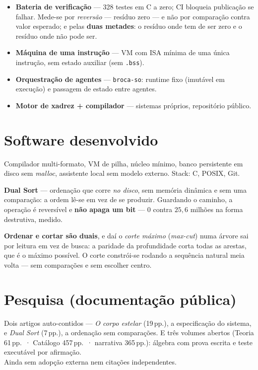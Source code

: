 \documentclass[10pt,a4paper]{article}
\begin{document}
\begin{itemize}
\item \textbf{Bateria de verificação} --- 328 testes em C a zero; CI bloqueia publicação se falhar.
Mede-se por \emph{reversão} --- resíduo zero --- e não por comparação contra valor esperado; e pelas
\textbf{duas metades}: o resíduo onde tem de ser zero e o resíduo onde não pode ser.
\item \textbf{Máquina de uma instrução} --- VM com ISA mínima de uma única instrução,
sem estado auxiliar (sem \texttt{.bss}).
\item \textbf{Orquestração de agentes} --- \texttt{broca-so}: runtime fixo (imutável em
execução) e passagem de estado entre agentes.
\item \textbf{Motor de xadrez + compilador} --- sistemas próprios, repositório público.
\end{itemize}

\section*{Software desenvolvido}

Compilador multi-formato, VM de pilha, núcleo mínimo, banco persistente em disco sem
\emph{malloc}, assistente local sem modelo externo. Stack: C, POSIX, Git.

\smallskip
\noindent \textbf{Dual Sort} --- ordenação que corre \emph{no disco}, sem memória dinâmica e sem
uma comparação: a ordem lê-se em vez de se produzir. Guardando o caminho, a operação é reversível e
\textbf{não apaga um bit} --- $0$ contra $25{,}6$ milhões na forma destrutiva, medido.

\smallskip
\noindent \textbf{Ordenar e cortar são duais}, e daí o \emph{corte máximo} (\emph{max-cut}) numa
árvore sai por leitura em vez de busca: a paridade da profundidade corta todas as arestas, que é o
máximo possível. O corte constrói-se rodando a sequência natural meia volta --- sem comparações e
sem escolher centro.

\section*{Pesquisa (documentação pública)}

Dois artigos auto-contidos --- \emph{O corpo estelar} (19\,pp.), a especificação do sistema, e
\emph{Dual Sort} (7\,pp.), a ordenação sem comparações. E três volumes abertos
(Teoria 61\,pp.\ · Catálogo 457\,pp.\ · narrativa 365\,pp.):
álgebra com prova escrita e teste executável por afirmação.
\\[1pt]
{\footnotesize\color{cinza}Ainda sem adopção externa nem citações independentes.}
\end{document}
